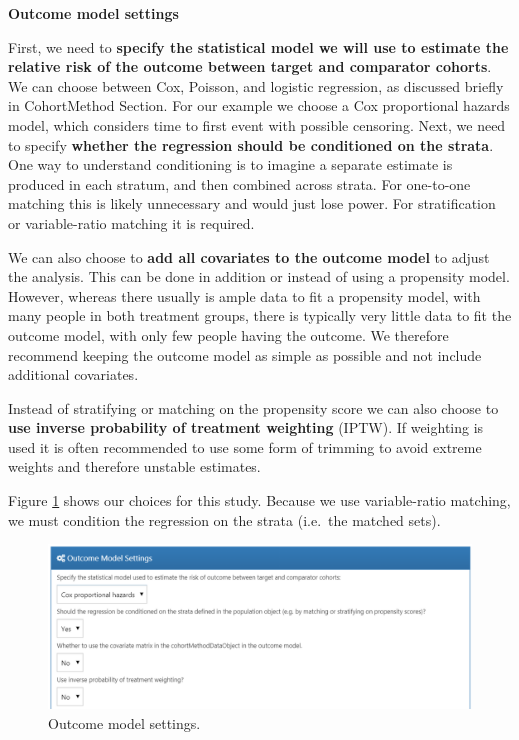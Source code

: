 \documentclass[]{book}
\begin{document}
\textbf{Outcome model settings}

First, we need to \textbf{specify the statistical model we will use to estimate the relative risk of the outcome between target and comparator cohorts}. We can choose between Cox, Poisson, and logistic regression, as discussed briefly in CohortMethod Section. For our example we choose a Cox proportional hazards model, which considers time to first event with possible censoring. Next, we need to specify \textbf{whether the regression should be conditioned on the strata}. One way to understand conditioning is to imagine a separate estimate is produced in each stratum, and then combined across strata. For one-to-one matching this is likely unnecessary and would just lose power. For stratification or variable-ratio matching it is required.  

We can also choose to \textbf{add all covariates to the outcome model} to adjust the analysis. This can be done in addition or instead of using a propensity model. However, whereas there usually is ample data to fit a propensity model, with many people in both treatment groups, there is typically very little data to fit the outcome model, with only few people having the outcome. We therefore recommend keeping the outcome model as simple as possible and not include additional covariates.

Instead of stratifying or matching on the propensity score we can also choose to \textbf{use inverse probability of treatment weighting} (IPTW). If weighting is used it is often recommended to use some form of trimming to avoid extreme weights and therefore unstable estimates.

Figure \ref{fig:outcomeModelSettings} shows our choices for this study. Because we use variable-ratio matching, we must condition the regression on the strata (i.e.~the matched sets).

\begin{figure}

{\centering \includegraphics[width=1\linewidth]{images/PopulationLevelEstimation/outcomeModelSettings} 

}

\caption{Outcome model settings.}\label{fig:outcomeModelSettings}
\end{figure}
\end{document}
